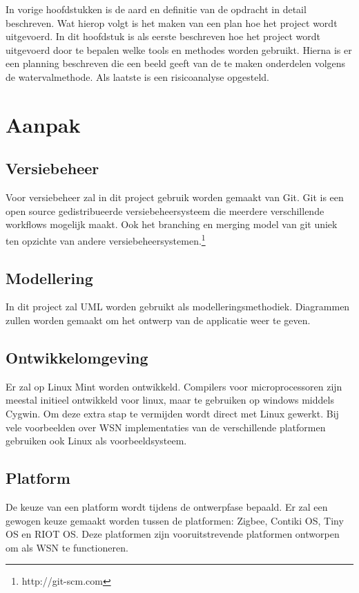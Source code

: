 \documentclass{../local}
\begin{document}
In vorige hoofdstukken is de aard en definitie van de opdracht in detail beschreven. Wat hierop volgt is het maken van een plan hoe het project wordt uitgevoerd. In dit hoofdstuk is als eerste beschreven hoe het project wordt uitgevoerd door te bepalen welke tools en methodes worden gebruikt. Hierna is er een planning beschreven die een beeld geeft van de te maken onderdelen volgens de watervalmethode. Als laatste is een risicoanalyse opgesteld.

\section{Aanpak}

\subsection{Versiebeheer}
Voor versiebeheer zal in dit project gebruik worden gemaakt van Git. Git is een open source gedistribueerde versiebeheersysteem die meerdere verschillende workflows mogelijk maakt. Ook het branching en merging model van git uniek ten opzichte van andere versiebeheersystemen.\footnote{http://git-scm.com}

\subsection{Modellering}
In dit project zal UML worden gebruikt als modelleringsmethodiek. Diagrammen zullen worden gemaakt om het ontwerp van de applicatie weer te geven.

\subsection{Ontwikkelomgeving}
Er zal op Linux Mint worden ontwikkeld. Compilers voor microprocessoren zijn meestal initieel ontwikkeld voor linux, maar te gebruiken op windows middels Cygwin. Om deze extra stap te vermijden wordt direct met Linux gewerkt. Bij vele voorbeelden over WSN implementaties van de verschillende platformen gebruiken ook Linux als voorbeeldsysteem.

\subsection{Platform}
De keuze van een platform wordt tijdens de ontwerpfase bepaald. Er zal een gewogen keuze gemaakt worden tussen de platformen: Zigbee, Contiki OS, Tiny OS en RIOT OS. Deze platformen zijn vooruitstrevende platformen ontworpen om als WSN te functioneren.
\end{document}
